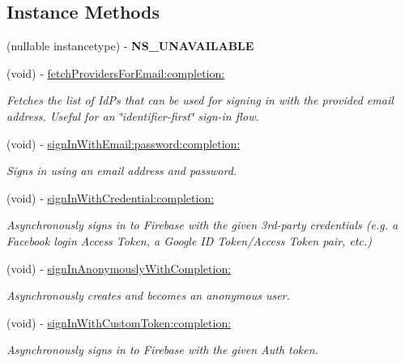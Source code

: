 \subsection*{Instance Methods}
\begin{DoxyCompactItemize}
\item 
\hypertarget{interface_f_i_r_auth_ac4a9c5d6d9c6858401fbacc74bee84c0}{}(nullable instancetype) -\/ {\bfseries N\+S\+\_\+\+U\+N\+A\+V\+A\+I\+L\+A\+B\+L\+E}\label{interface_f_i_r_auth_ac4a9c5d6d9c6858401fbacc74bee84c0}

\item 
(void) -\/ \hyperlink{interface_f_i_r_auth_a73b6d5a22b27b7d73a686d70fa275718}{fetch\+Providers\+For\+Email\+:completion\+:}
\begin{DoxyCompactList}\small\item\em Fetches the list of Id\+Ps that can be used for signing in with the provided email address. Useful for an \char`\"{}identifier-\/first\char`\"{} sign-\/in flow. \end{DoxyCompactList}\item 
(void) -\/ \hyperlink{interface_f_i_r_auth_a4156646de978ff01c961edb6eab8f937}{sign\+In\+With\+Email\+:password\+:completion\+:}
\begin{DoxyCompactList}\small\item\em Signs in using an email address and password. \end{DoxyCompactList}\item 
(void) -\/ \hyperlink{interface_f_i_r_auth_a693aa99f8a912fa89b370917c47b06ab}{sign\+In\+With\+Credential\+:completion\+:}
\begin{DoxyCompactList}\small\item\em Asynchronously signs in to Firebase with the given 3rd-\/party credentials (e.\+g. a Facebook login Access Token, a Google I\+D Token/\+Access Token pair, etc.) \end{DoxyCompactList}\item 
(void) -\/ \hyperlink{interface_f_i_r_auth_a0ffa43acd046e5ee42967106f73556f6}{sign\+In\+Anonymously\+With\+Completion\+:}
\begin{DoxyCompactList}\small\item\em Asynchronously creates and becomes an anonymous user. \end{DoxyCompactList}\item 
(void) -\/ \hyperlink{interface_f_i_r_auth_ad3ac6db56df7193d2b40648cd9ffd060}{sign\+In\+With\+Custom\+Token\+:completion\+:}
\begin{DoxyCompactList}\small\item\em Asynchronously signs in to Firebase with the given Auth token. \end{DoxyCompactList}\item 

\end{DoxyCompactItemize}

